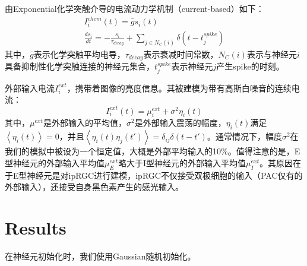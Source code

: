 \documentclass[lang=cn,11pt,a4paper,cite=numbers]{elegantpaper}
\begin{document}
  由Exponential化学突触介导的电流动力学机制（current-based）如下：
\begin{gather}
    I_{i}^{chem}(t) = \bar{g}s_{i}(t) \\
    \frac{ds_{i}}{dt} = -\frac{s_{i}}{\tau_{decay}} + \sum_{j \in N_{C}(i)}\delta(t - t_{j}^{spike})
\end{gather}
其中，$\bar{g}$表示化学突触平均电导，$\tau_{decay}$表示衰减时间常数，$N_{C}(i)$表示与神经元$i$具备抑制性化学突触连接的神经元集合，$t_{j}^{spike}$表示神经元$j$产生spike的时刻。

  外部输入电流$I_{i}^{ext}$，携带着图像的亮度信息。其被建模为带有高斯白噪音的连续电流：
\begin{equation}
    I_{i}^{ext}(t) = \mu_{i}^{ext} + \sigma^{2}\eta_{i}(t)
\end{equation}
其中，$\mu^{ext}$是外部输入的平均值，$\sigma^{2}$是外部输入震荡的幅度，$\eta_{i}(t)$满足$\left\langle\eta_{i}(t)\right\rangle = 0$，并且$\left\langle\eta_{i}(t)\eta_{j}(t')\right\rangle = \delta_{ij}\delta(t - t')$。通常情况下，幅度$\sigma^{2}$在我们的模拟中被设为一个恒定值，大概是外部平均输入的10\%。值得注意的是，E型神经元的外部输入平均值$\mu_{E}^{ext}$略大于I型神经元的外部输入平均值$\mu_{I}^{ext}$。其原因在于E型神经元是对ipRGC进行建模，ipRGC不仅接受双极细胞的输入（PAC仅有的外部输入），还接受自身黑色素产生的感光输入。

\section{Results}
  在神经元初始化时，我们使用Gaussian随机初始化。
\end{document}
